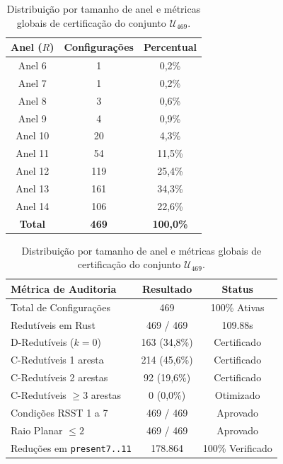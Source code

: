 \documentclass[11pt,a4paper]{article}
\begin{document}
\begin{table}[h!]
\centering
\begin{minipage}{0.45\textwidth}
\centering
\begin{tabular}{ccc}
\toprule
\textbf{Anel ($R$)} & \textbf{Configurações} & \textbf{Percentual} \\
\midrule
Anel 6 & 1 & 0,2\% \\
Anel 7 & 1 & 0,2\% \\
Anel 8 & 3 & 0,6\% \\
Anel 9 & 4 & 0,9\% \\
Anel 10 & 20 & 4,3\% \\
Anel 11 & 54 & 11,5\% \\
Anel 12 & 119 & 25,4\% \\
Anel 13 & 161 & 34,3\% \\
Anel 14 & 106 & 22,6\% \\
\midrule
\textbf{Total} & \textbf{469} & \textbf{100,0\%} \\
\bottomrule
\end{tabular}
\end{minipage}
\hfill
\begin{minipage}{0.52\textwidth}
\centering
\begin{tabular}{lcc}
\toprule
\textbf{Métrica de Auditoria} & \textbf{Resultado} & \textbf{Status} \\
\midrule
Total de Configurações & 469 & 100\% Ativas \\
Redutíveis em Rust & 469 / 469 & 109.88s \\
D-Redutíveis ($k=0$) & 163 (34,8\%) & Certificado \\
C-Redutíveis 1 aresta & 214 (45,6\%) & Certificado \\
C-Redutíveis 2 arestas & 92 (19,6\%) & Certificado \\
C-Redutíveis $\ge 3$ arestas & 0 (0,0\%) & Otimizado \\
Condições RSST 1 a 7 & 469 / 469 & Aprovado \\
Raio Planar $\le 2$ & 469 / 469 & Aprovado \\
Reduções em \texttt{present7..11} & 178.864 & 100\% Verificado \\
\bottomrule
\end{tabular}
\end{minipage}
\caption{Distribuição por tamanho de anel e métricas globais de certificação do conjunto $\mathcal{U}_{469}$.}
\end{table}

\vspace{0.5cm}
\end{document}
